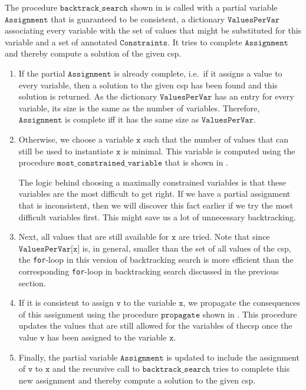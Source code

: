 The procedure $\texttt{backtrack\_search}$ shown in  is called with a
partial variable $\texttt{Assignment}$ that is guaranteed to be consistent, a dictionary
$\texttt{ValuesPerVar}$ associating every variable with the set of values that might be substituted for this variable and a
set of annotated $\texttt{Constraints}$.  It tries to complete $\texttt{Assignment}$ and thereby compute a
solution of the given \ac{csp}.  
\begin{enumerate}
\item If the partial $\texttt{Assignment}$ is already complete, i.e.~if it assigns a value to every variable, 
      then a solution to the given \ac{csp} has been found and this solution is returned.  As the
      dictionary $\mathtt{ValuesPerVar}$ has an entry for every variable, its size is the same as the number of
      variables. Therefore, $\mathtt{Assignment}$ is complete iff it has the same size as $\mathtt{ValuesPerVar}$.
\item Otherwise, we choose a variable $\texttt{x}$ such that the number of values that can still be used to
      instantiate $\texttt{x}$ is minimal.  This variable is computed using the procedure
      $\texttt{most\_constrained\_variable}$ that is shown in .
      
      The logic behind choosing a maximally constrained variables is that these variables are the most
      difficult to get right.  If we have a partial assignment that is inconsistent, then we will discover this
      fact earlier if we try the most difficult variables first.  This might save us a lot of unnecessary
      backtracking. 
\item Next, all values that are still available for $\texttt{x}$ are tried.  Note that since
      $\texttt{ValuesPerVar[x]}$ is, in general, smaller than the set of all values of the \ac{csp},
      the \texttt{for}-loop in this version of backtracking search is more efficient than the corresponding
      \texttt{for}-loop in backtracking search discussed in the previous section. 
\item If it is consistent to assign $\texttt{v}$ to the variable $\texttt{x}$, we propagate the consequences
      of this assignment using the procedure $\texttt{propagate}$ shown in
      .
      This procedure updates the values that are still allowed for the variables of the\ac{csp} once the
      value $\texttt{v}$ has been assigned to the variable $\texttt{x}$.
\item Finally, the partial variable $\texttt{Assignment}$ is updated to include the assignment of 
      $\texttt{v}$ to $\texttt{x}$ and the recursive call to $\texttt{backtrack\_search}$ tries to complete this new
      assignment and thereby compute a solution to the given \ac{csp}. 
\end{enumerate}

